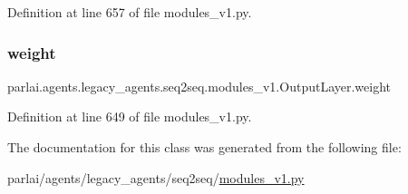 Definition at line 657 of file modules\+\_\+v1.\+py.

\mbox{\label{classparlai_1_1agents_1_1legacy__agents_1_1seq2seq_1_1modules__v1_1_1OutputLayer_aa16722ddd0a958a40f91d8f9c6b77b11}} 
\subsubsection{\texorpdfstring{weight}{weight}}
{\footnotesize\ttfamily parlai.\+agents.\+legacy\+\_\+agents.\+seq2seq.\+modules\+\_\+v1.\+Output\+Layer.\+weight}



Definition at line 649 of file modules\+\_\+v1.\+py.



The documentation for this class was generated from the following file\+:\begin{DoxyCompactItemize}
\item 
parlai/agents/legacy\+\_\+agents/seq2seq/\hyperlink{modules__v1_8py}{modules\+\_\+v1.\+py}\end{DoxyCompactItemize}
